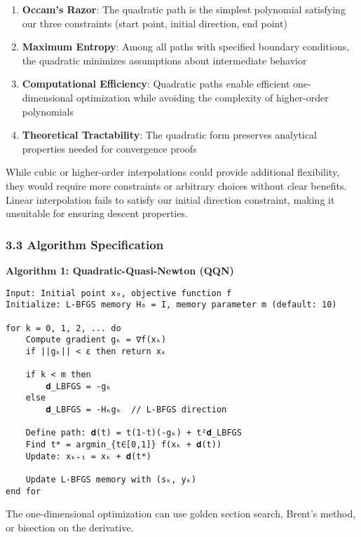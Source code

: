 \begin{enumerate}
\def\labelenumi{\arabic{enumi}.}
\tightlist
\item
  \textbf{Occam's Razor}: The quadratic path is the simplest polynomial satisfying our three constraints (start point,
  initial direction, end point)
\item
  \textbf{Maximum Entropy}: Among all paths with specified boundary conditions, the quadratic minimizes assumptions about
  intermediate behavior
\item
  \textbf{Computational Efficiency}: Quadratic paths enable efficient one-dimensional optimization while avoiding the
  complexity of higher-order polynomials
\item
  \textbf{Theoretical Tractability}: The quadratic form preserves analytical properties needed for convergence proofs
\end{enumerate}

While cubic or higher-order interpolations could provide additional flexibility, they would require more constraints or
arbitrary choices without clear benefits. Linear interpolation fails to satisfy our initial direction constraint, making
it unsuitable for ensuring descent properties.

\hypertarget{algorithm-specification}{%
\subsubsection{3.3 Algorithm Specification}\label{algorithm-specification}}

\textbf{Algorithm 1: Quadratic-Quasi-Newton (QQN)}

\begin{verbatim}
Input: Initial point x₀, objective function f
Initialize: L-BFGS memory H₀ = I, memory parameter m (default: 10)

for k = 0, 1, 2, ... do
    Compute gradient gₖ = ∇f(xₖ)
    if ||gₖ|| < ε then return xₖ

    if k < m then
        𝐝_LBFGS = -gₖ
    else
        𝐝_LBFGS = -Hₖgₖ  // L-BFGS direction

    Define path: 𝐝(t) = t(1-t)(-gₖ) + t²𝐝_LBFGS
    Find t* = argmin_{t∈[0,1]} f(xₖ + 𝐝(t))
    Update: xₖ₊₁ = xₖ + 𝐝(t*)

    Update L-BFGS memory with (sₖ, yₖ)
end for
\end{verbatim}

The one-dimensional optimization can use golden section search, Brent's method, or bisection on the derivative.

